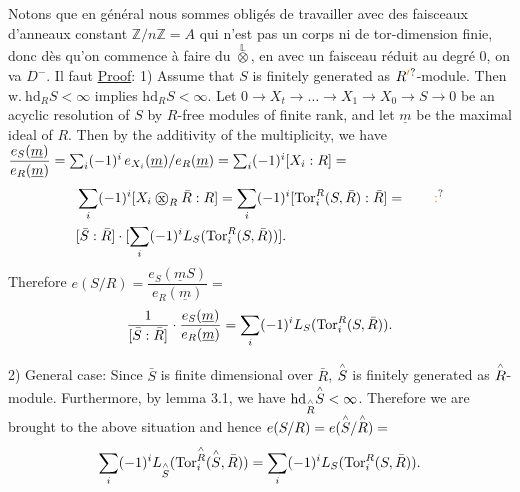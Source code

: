 
Notons que en général nous sommes obligés de travailler avec des faisceaux d'anneaux constant $\mathbb Z/n\mathbb Z=A$ qui n'est pas un corps ni de tor-dimension  finie, donc dès qu'on commence à faire du $\overset{\mathbb L}{\otimes}$,  en  avec un faisceau réduit au degré 0, on va   $D^-$. Il faut
\uline{Proof}: 1) Assume that $S$ is finitely generated as $R\unsure{'}$-module. Then
$\mathrm{w.}\ \mathrm{hd}_R S<\infty$ implies $\mathrm{hd}_R S<\infty$. Let $0\longrightarrow X_t\longrightarrow\ldots\longrightarrow X_1\longrightarrow X_0\longrightarrow
S\longrightarrow 0$ be an acyclic resolution of $S$ by $R$-free modules of finite rank,
and let $\underline m$ be the maximal ideal of $R$. Then by the additivity of the multiplicity,
we have $\dfrac{e_S(\underline m)}{e_R(\underline m)}=\sum_i(-1)^i\,e_{X_i}(\underline m)/e_R(\underline m)=\sum_i(-1)^i[X_i:R]=$
\[
\begin{aligned}
&\handwritten{\sum}_i(-1)^i[X_i\mathbin{\ooalign{\hfil$\mathrm{x}$\hfil\cr\hfil$\handwritten{\bigcirc}$\hfil\cr}}_R\bar R:R]=\handwritten{\sum}_i(-1)^i[\operatorname{Tor}_i^R(S,\bar R):\bar R]=\qquad\unsure{:}\\
&[\bar S:\bar R]\cdot[\handwritten{\sum}_i(-1)^i L_S(\operatorname{Tor}_i^R(S,\bar R))].
\end{aligned}
\]
Therefore $e(S/R)=\dfrac{e_S(\underline m S)}{e_R(\underline m)}=$
\[
\dfrac{1}{[\bar S:\bar R]}\cdot\dfrac{e_S(\underline m)}{e_R(\underline m)}=\sum_i(-1)^i L_S(\operatorname{Tor}_i^R(S,\bar R)).
\]

2) General case: Since $\bar S$ is finite dimensional over $\bar R$, $\overset{\scriptscriptstyle\wedge}{S}$ is finitely
generated as $\overset{\scriptscriptstyle\wedge}{R}$-module. Furthermore, by lemma 3.1, we have $\mathrm{hd}_{\overset{\scriptscriptstyle\wedge}{R}}\overset{\scriptscriptstyle\wedge}{S}<\infty$.
Therefore we are brought to the above situation and hence $e(S/R)=e(\overset{\scriptscriptstyle\wedge}{S}/\overset{\scriptscriptstyle\wedge}{R})=$
\[
\sum_i(-1)^i L_{\overset{\scriptscriptstyle\wedge}{S}}(\operatorname{Tor}_i^{\overset{\scriptscriptstyle\wedge}{R}}(\overset{\scriptscriptstyle\wedge}{S},\bar R))=\sum_i(-1)^i L_S(\operatorname{Tor}_i^R(S,\bar R)).
\]

